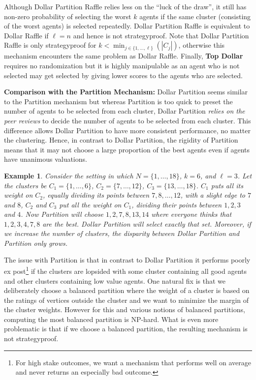 \documentclass[letterpaper]{article}
\newtheorem{example}[theorem]{Example}
\begin{document}
Although Dollar Partition Raffle relies less on the ``luck of the draw'', it still has non-zero probability of selecting the worst $k$ agents if the same cluster (consisting of the worst agents) is selected repeatedly. %
Dollar Partition Raffle is equivalent to Dollar Raffle if $\ell=n$ and hence is not strategyproof. Note that Dollar Partition Raffle is only strategyproof for $k<\min_{j\in \{1, \ldots, \ell\}}(|C_{j}|)$, otherwise this mechanism encounters the same problem as Dollar Raffle.
Finally, \textbf{Top Dollar} requires no randomization but it is highly manipulable as an agent who is not selected may get selected by giving lower scores to the agents who are selected.

\smallskip
\noindent
\textbf{Comparison with the Partition Mechanism:}
Dollar Partition seems similar to the Partition mechanism but whereas Partition is too quick to preset the number of agents to be selected from each cluster, Dollar Partition \emph{relies on the peer reviews} to decide the number of agents to be selected from each cluster. This difference allows Dollar Partition to have more consistent performance, no matter the clustering. Hence, in contrast to Dollar Partition, the rigidity of Partition means that it may not choose a large proportion of the best agents even if agents have unanimous valuations.

\begin{example}
Consider the setting in which	$N=\{1,\ldots, 18\}$, $k=6$, and $\ell=3$. Let the clusters be $C_1=\{1,\ldots, 6\}$, $C_2=\{7,\ldots, 12\}$, $C_3=\{13,\ldots, 18\}$. $C_1$ puts all its weight on $C_2$, equally dividing its points between $7,8,\ldots,12$, with a slight edge to $7$ and $8$, $C_2$ and $C_3$ put all the weight on $C_1$, dividing their points between $1,2,3$ and $4$. Now Partition will choose $1,2,7,8,13,14$ where everyone thinks that $1,2,3,4,7,8$ are the best. Dollar Partition will select exactly that set. Moreover, if we increase the number of clusters, the disparity between Dollar Partition and Partition only grows.
\end{example}

The issue with Partition is that in contrast to Dollar Partition it performs poorly ex post\footnote{For high stake outcomes, we want a mechanism that performs well on average and never returns an especially bad outcome.} if the clusters are lopsided with some cluster containing all good agents and other clusters containing low value agents. One natural fix is that we deliberately choose a balanced partition where the weight of a cluster is based on the ratings of vertices outside the cluster and we want to minimize the margin of the cluster weights.
However for this and various notions of balanced partitions, computing the most balanced partition is NP-hard. What is even more problematic is that if we choose a balanced partition, the resulting mechanism is not strategyproof.%
\end{document}
